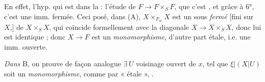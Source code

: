 \documentclass[11pt,a4paper]{article}
\begin{document}
En effet, l'hyp. \ill{} qui est  dans la \ill{}
\ill{}  : l'étude de $F \to F \times_S F$, \ill{}
 que c'est , et grâce à 6°, c'est une
imm. fermée. Ceci posé, dans (A), $X \times_{F_{S'}} X$ est un sous
 \emph{fermé} [fini sur $X$,] de $X \times_S X$, qui
coïncide formellement avec la diagonale $X \to X \times_S X$, donc lui est
identique ; donc $X \to F$ est un \emph{monomorphisme}, d'autre part
étale, i.e. une imm. ouverte.

\emph{Dans} B, on prouve de façon analogue \ill{} $\exists\, U$ voisinage
ouvert de $x$, tel que $\xi | (X|U)$  soit un
\emph{monomorphisme}, comme \ill{} \ill{} \ill{} par « étale », \ill{}
\ill{}.
\end{document}

